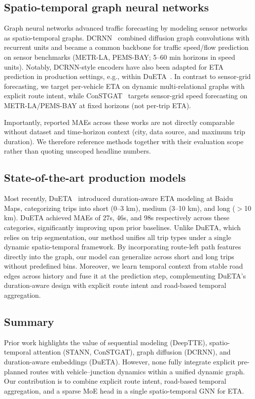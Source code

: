 \subsection{Spatio-temporal graph neural networks}
Graph neural networks advanced traffic forecasting by modeling sensor networks as spatio-temporal graphs. DCRNN~\cite{dcrnn2018} combined diffusion graph convolutions with recurrent units and became a common backbone for traffic speed/flow prediction on sensor benchmarks (METR-LA, PEMS-BAY; 5–60 min horizons in speed units). Notably, DCRNN-style encoders have also been adapted for ETA prediction in production settings, e.g., within DuETA~\cite{dueta2023}. In contrast to sensor-grid forecasting, we target per-vehicle ETA on dynamic multi-relational graphs with explicit route intent, while ConSTGAT~\cite{constgat2020} targets sensor-grid speed forecasting on METR-LA/PEMS-BAY at fixed horizons (not per-trip ETA).

Importantly, reported MAEs across these works are not directly comparable without dataset and time-horizon context (city, data source, and maximum trip duration). We therefore reference methods together with their evaluation scope rather than quoting unscoped headline numbers.

\subsection{State-of-the-art production models}
Most recently, DuETA~\cite{dueta2023} introduced duration-aware ETA modeling at Baidu Maps, categorizing trips into short (0--3 km), medium (3--10 km), and long ($>$10 km). DuETA achieved MAEs of 27s, 46s, and 98s respectively across these categories, significantly improving upon prior baselines. Unlike DuETA, which relies on trip segmentation, our method unifies all trip types under a single dynamic spatio-temporal framework. By incorporating route-left path features directly into the graph, our model can generalize across short and long trips without predefined bins. Moreover, we learn temporal context from stable road edges across history and fuse it at the prediction step, complementing DuETA's duration-aware design with explicit route intent and road-based temporal aggregation.

\subsection{Summary}
Prior work highlights the value of sequential modeling (DeepTTE), spatio-temporal attention (STANN, ConSTGAT), graph diffusion (DCRNN), and duration-aware embeddings (DuETA). However, none fully integrate explicit pre-planned routes with vehicle–junction dynamics within a unified dynamic graph. Our contribution is to combine explicit route intent, road-based temporal aggregation, and a sparse MoE head in a single spatio-temporal GNN for ETA.
